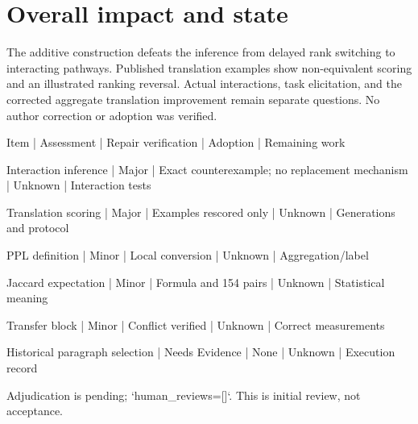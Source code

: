 \documentclass[10pt]{article}
\begin{document}
\section*{Overall impact and state}
The additive construction defeats the inference from delayed rank switching to interacting pathways. Published translation examples show non-equivalent scoring and an illustrated ranking reversal. Actual interactions, task elicitation, and the corrected aggregate translation improvement remain separate questions. No author correction or adoption was verified.\par
Item | Assessment | Repair verification | Adoption | Remaining work\par
Interaction inference | Major | Exact counterexample; no replacement mechanism | Unknown | Interaction tests\par
Translation scoring | Major | Examples rescored only | Unknown | Generations and protocol\par
PPL definition | Minor | Local conversion | Unknown | Aggregation/label\par
Jaccard expectation | Minor | Formula and 154 pairs | Unknown | Statistical meaning\par
Transfer block | Minor | Conflict verified | Unknown | Correct measurements\par
Historical paragraph selection | Needs Evidence | None | Unknown | Execution record\par
Adjudication is pending; `human\_reviews=[]`. This is initial review, not acceptance.\par
\end{document}
